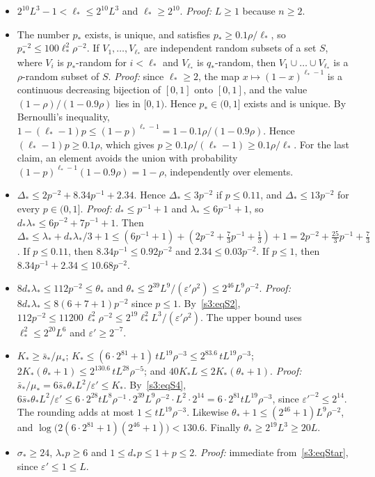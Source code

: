 \begin{itemize}
\item[(S1)] $2^{10}L^3-1<\ell_*\le 2^{10}L^3$ and $\ell_*\ge 2^{10}$.
  \emph{Proof:} $L\ge1$ because $n\ge2$.
\item[(S2)] The number $p_*$ exists, is unique, and satisfies $p_*\ge 0.1\rho/\ell_*$, so
  $p_*^{-2}\le 100\ell_*^2\rho^{-2}$. If $V_1,\dots,V_{\ell_*}$ are independent random subsets of a
  set $S$, where $V_i$ is $p_*$-random for $i<\ell_*$ and $V_{\ell_*}$ is $q_*$-random, then
  $V_1\cup\dots\cup V_{\ell_*}$ is a $\rho$-random subset of $S$.
  \emph{Proof:} since $\ell_*\ge2$, the map $x\mapsto(1-x)^{\ell_*-1}$ is a continuous decreasing
  bijection of $[0,1]$ onto $[0,1]$, and the value $(1-\rho)/(1-0.9\rho)$ lies in $[0,1)$. Hence
  $p_*\in(0,1]$ exists and is unique. By Bernoulli's inequality,
  $1-(\ell_*-1)p\le(1-p)^{\ell_*-1}=1-0.1\rho/(1-0.9\rho)$. Hence $(\ell_*-1)p\ge 0.1\rho$, which
  gives $p\ge 0.1\rho/(\ell_*-1)\ge 0.1\rho/\ell_*$. For the last claim, an element avoids the union
  with probability $(1-p)^{\ell_*-1}(1-0.9\rho)=1-\rho$, independently over elements.
\item[(S3)] $\Delta_*\le 2p^{-2}+8.34p^{-1}+2.34$. Hence
  $\Delta_*\le 3p^{-2}$ if $p\le 0.11$, and $\Delta_*\le 13p^{-2}$ for every $p\in(0,1]$.
  \emph{Proof:} $d_*\le p^{-1}+1$ and $\lambda_*\le 6p^{-1}+1$, so
  $d_*\lambda_*\le 6p^{-2}+7p^{-1}+1$. Then
  $\Delta_*\le \lambda_*+d_*\lambda_*/3+1\le(6p^{-1}+1)+(2p^{-2}+\tfrac73p^{-1}+\tfrac13)+1
  =2p^{-2}+\tfrac{25}{3}p^{-1}+\tfrac73$.
  If $p\le0.11$, then $8.34p^{-1}\le 0.92p^{-2}$ and $2.34\le 0.03p^{-2}$. If $p\le1$, then
  $8.34p^{-1}+2.34\le 10.68p^{-2}$.
\item[(S4)] $8d_*\lambda_*\le 112p^{-2}\le\theta_*$ and
  $\theta_*\le 2^{39}L^9/(\varepsilon'\rho^2)\le 2^{46}L^9\rho^{-2}$.
  \emph{Proof:} $8d_*\lambda_*\le 8(6+7+1)p^{-2}$ since $p\le1$. By~\ref{s3:eqS2},
  $112p^{-2}\le 11200\,\ell_*^2\rho^{-2}\le 2^{19}\ell_*^2L^3/(\varepsilon'\rho^2)$. The upper bound
  uses $\ell_*^2\le 2^{20}L^6$ and $\varepsilon'\ge2^{-7}$.
\item[(S5)] $K_*\ge\bar s_*/\mu_*$;
  $K_*\le(6\cdot2^{81}+1)\,tL^{19}\rho^{-3}\le 2^{83.6}\,tL^{19}\rho^{-3}$;
  $2K_*(\theta_*+1)\le 2^{130.6}\,tL^{28}\rho^{-5}$; and $40K_*L\le 2K_*(\theta_*+1)$.
  \emph{Proof:} $\bar s_*/\mu_*=6\bar s_*\theta_*L^2/\varepsilon'\le K_*$. By~\ref{s3:eqS4},
  $6\bar s_*\theta_*L^2/\varepsilon'\le 6\cdot2^{28}tL^8\rho^{-1}\cdot 2^{39}L^9\rho^{-2}\cdot L^2\cdot
  2^{14}=6\cdot2^{81}tL^{19}\rho^{-3}$, since $\varepsilon'^{-2}\le2^{14}$. The rounding adds at most
  $1\le tL^{19}\rho^{-3}$. Likewise $\theta_*+1\le(2^{46}+1)L^9\rho^{-2}$, and
  $\log\big(2(6\cdot2^{81}+1)(2^{46}+1)\big)<130.6$. Finally
  $\theta_*\ge 2^{19}L^3\ge 20L$.
\item[(S6)] $\sigma_*\ge24$, $\lambda_*p\ge6$ and $1\le d_*p\le 1+p\le2$.
  \emph{Proof:} immediate from~\eqref{s3:eqStar}, since $\varepsilon'\le1\le L$.
\end{itemize}

